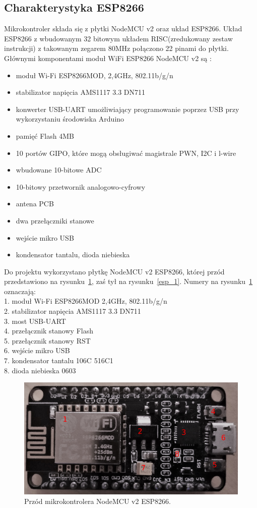 \documentclass[12p]{article}
\begin{document}
\subsection{Charakterystyka ESP8266}

\quad Mikrokontroler składa się z płytki NodeMCU v2 oraz układ ESP8266. Układ ESP8266 z wbudowanym 32 bitowym układem RISC(zredukowany zestaw instrukcji) z takowanym zegarem 80MHz połączono 22 pinami do płytki. Głównymi komponentami moduł WiFi ESP8266 NodeMCU v2 są :
\begin{itemize}
\item moduł Wi-Fi ESP8266MOD, 2,4GHz, 802.11b/g/n
\item stabilizator napięcia AMS1117 3.3 DN711
\item konwerter USB-UART umożliwiający programowanie poprzez USB przy wykorzystaniu środowiska Arduino
\item pamięć Flash 4MB
\item 10 portów GIPO, które mogą obsługiwać magistrale PWN, I2C i l-wire
\item wbudowane 10-bitowe ADC 
\item 10-bitowy przetwornik analogowo-cyfrowy
\item antena PCB
\item dwa przełączniki stanowe 
\item wejście mikro USB
\item kondensator tantalu, dioda niebieska
\end{itemize} 


Do projektu wykorzystano płytkę NodeMCU v2 ESP8266, której przód przedstawiono na rysunku~\ref{esp}, zaś tył na rysunku~\ref{esp_1}. Numery na rysunku~\ref{esp} oznaczają:\\ 
1. moduł Wi-Fi ESP8266MOD 2,4GHz, 802.11b/g/n\\
2. stabilizator napięcia AMS1117 3.3 DN711\\
3. most USB-UART\\
4. przełącznik stanowy Flash\\
5. przełącznik stanowy RST\\
6. wejście mikro USB\\
7. kondensator tantalu 106C 516C1\\
8. dioda niebieska 0603\\

\begin{figure}[H]
\centering
\includegraphics[width=12cm]{esp.png}
\caption{Przód mikrokontrolera NodeMCU v2 ESP8266.}\label{esp}
\end{figure}
\end{document}
